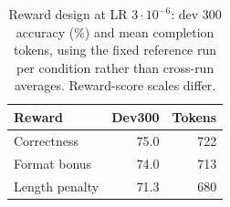 \begin{table}[t]
\centering
\caption{Reward design at LR $3\cdot 10^{-6}$: dev 300 accuracy (\%) and mean completion tokens, using the fixed reference run per condition rather than cross-run averages. Reward-score scales differ.}
\label{tab:rewards}
\footnotesize
\setlength{\tabcolsep}{4pt}
\begin{tabular}{lrr}
\toprule
Reward & Dev300 & Tokens\\
\midrule
Correctness & 75.0 & 722\\
Format bonus & 74.0 & 713\\
Length penalty & 71.3 & 680\\
\bottomrule
\end{tabular}
\end{table}
